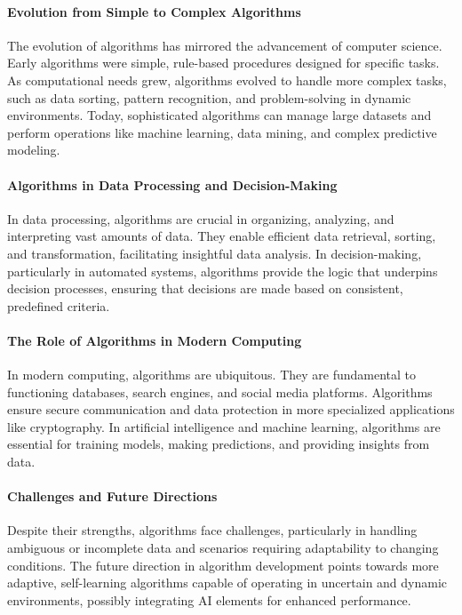 \documentclass{article}
\begin{document}
\paragraph{Evolution from Simple to Complex Algorithms}
The evolution of algorithms has mirrored the advancement of computer science. Early algorithms were simple, rule-based procedures designed for specific tasks. As computational needs grew, algorithms evolved to handle more complex tasks, such as data sorting, pattern recognition, and problem-solving in dynamic environments. Today, sophisticated algorithms can manage large datasets and perform operations like machine learning, data mining, and complex predictive modeling.

\paragraph{Algorithms in Data Processing and Decision-Making}
In data processing, algorithms are crucial in organizing, analyzing, and interpreting vast amounts of data. They enable efficient data retrieval, sorting, and transformation, facilitating insightful data analysis. In decision-making, particularly in automated systems, algorithms provide the logic that underpins decision processes, ensuring that decisions are made based on consistent, predefined criteria.

\paragraph{The Role of Algorithms in Modern Computing}
In modern computing, algorithms are ubiquitous. They are fundamental to functioning databases, search engines, and social media platforms. Algorithms ensure secure communication and data protection in more specialized applications like cryptography. In artificial intelligence and machine learning, algorithms are essential for training models, making predictions, and providing insights from data.

\paragraph{Challenges and Future Directions}
Despite their strengths, algorithms face challenges, particularly in handling ambiguous or incomplete data and scenarios requiring adaptability to changing conditions. The future direction in algorithm development points towards more adaptive, self-learning algorithms capable of operating in uncertain and dynamic environments, possibly integrating AI elements for enhanced performance.
\end{document}
